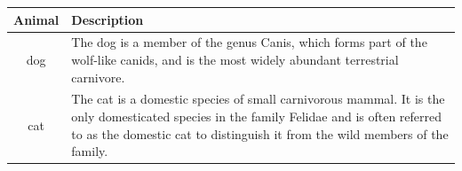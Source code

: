 \documentclass{article}
\begin{document}
\begin{tabular}{cp{9cm}}
\toprule
Animal & Description \\
\midrule
dog & The dog is a member of the genus Canis, which forms
part of the
wolf-like canids, and is the most widely abundant
terrestrial
carnivore. \\
\addlinespace
cat & The cat is a domestic species of small carnivorous
mammal. It is the
only domesticated species in the family Felidae and
is often referred
to as the domestic cat to distinguish it from the
wild members of the
family. \\
\bottomrule
\end{tabular}
\end{document}
